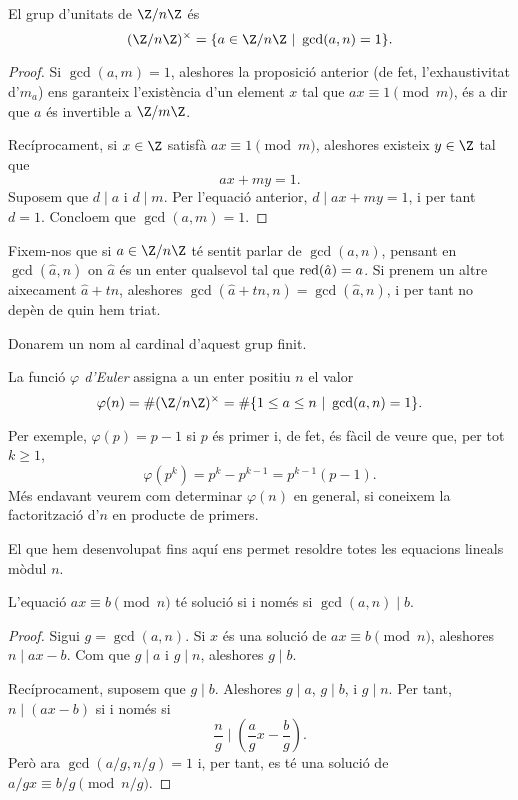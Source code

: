  \begin{corollary}[Unitats de $\Z/n\Z$]
 El grup d'unitats de $\Z/n\Z$ és
 \[
 (\Z/n\Z)^\times = \{ a\in\Z/n\Z ~|~ \gcd(a,n)=1\}.
 \]
 \end{corollary}
 \begin{proof}
  Si $\gcd(a,m)=1$, aleshores la proposició anterior (de fet, l'exhaustivitat d'$m_a$) ens garanteix l'existència d'un element $x$ tal que $ax\equiv 1\pmod{m}$, és a dir que $a$ és invertible a $\Z/m\Z$.
  
  Recíprocament, si $x\in\Z$ satisfà $ax\equiv 1\pmod{m}$, aleshores existeix $y\in\Z$ tal que
  \[
  ax+my = 1.
  \]
  Suposem que $d\mid a$ i $d\mid m$. Per l'equació anterior, $d\mid ax+my=1$, i per tant $d=1$. Concloem que $\gcd(a,m)=1$.
 \end{proof}
 
 \begin{remark}
 Fixem-nos que si $a\in\Z/n\Z$ té sentit parlar de $\gcd(a,n)$, pensant en $\gcd(\hat a,n)$ on $\hat a$ és un enter qualsevol tal que $\operatorname{red}(\hat a)=a$. Si prenem un altre aixecament $\hat a+ tn$, aleshores $\gcd(\hat a+tn,n)=\gcd(\hat a,n)$, i per tant no depèn de quin hem triat.
 \end{remark}
 Donarem un nom al cardinal d'aquest grup finit.
 \begin{definition}
 La funció \emph{$\varphi$ d'Euler} assigna a un enter positiu $n$ el valor
 \[
 \varphi(n)=\#(\Z/n\Z)^\times=\#\{1\leq a\leq n~|~ \gcd(a,n)=1\}.
 \]
 \end{definition}
 Per exemple, $\varphi(p) = p-1$ si $p$ és primer i, de fet, és fàcil de veure que, per tot $k\geq 1$,
 \[
 \varphi(p^k) = p^k - p^{k-1} = p^{k-1}(p-1).
 \]
 Més endavant veurem com determinar $\varphi(n)$ en general, si coneixem la factorització d'$n$ en producte de primers.
 
 El que hem desenvolupat fins aquí ens permet resoldre totes les equacions lineals mòdul $n$.
 
 \begin{proposition}
 \label{prop:eqslineals}
 L'equació $ax\equiv b\pmod n$ té  solució si i només si $\gcd(a,n)\mid b$.
 \end{proposition}
 \begin{proof}
  Sigui $g=\gcd(a,n)$. Si $x$ és una solució de $ax\equiv b\pmod n$, aleshores $n\mid ax-b$. Com que $g\mid a$ i $g\mid n$, aleshores $g\mid b$.
  
  Recíprocament, suposem que $g\mid b$. Aleshores $g\mid a$, $g\mid b$, i $g\mid n$. Per tant, $n\mid (ax-b)$ si i només si
  \[
  \frac n g\mid \left(\frac a g x - \frac b g\right).
  \]
  Però ara $\gcd(a/g,n/g)=1$ i, per tant, es té una solució de $a/g x \equiv b/g \pmod{n/g}$.
 \end{proof}

